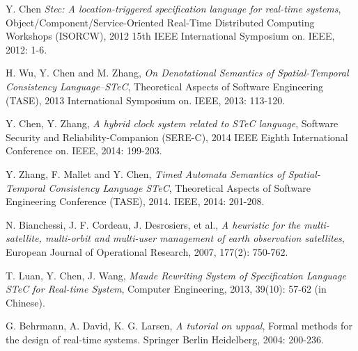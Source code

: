 \begin{thebibliography}{2}
Y. Chen \emph{Stec: A location-triggered specification language for real-time systems}, Object/Component/Service-Oriented Real-Time Distributed Computing Workshops (ISORCW), 2012 15th IEEE International Symposium on. IEEE, 2012: 1-6.

H. Wu, Y. Chen and M. Zhang, \emph{On Denotational Semantics of Spatial-Temporal Consistency Language--STeC}, Theoretical Aspects of Software Engineering (TASE), 2013 International Symposium on. IEEE, 2013: 113-120.

Y. Chen, Y. Zhang, \emph{A hybrid clock system related to STeC language}, Software Security and Reliability-Companion (SERE-C), 2014 IEEE Eighth International Conference on. IEEE, 2014: 199-203.

Y. Zhang, F. Mallet and Y. Chen, \emph{Timed Automata Semantics of Spatial-Temporal Consistency Language STeC}, Theoretical Aspects of Software Engineering Conference (TASE), 2014. IEEE, 2014: 201-208.

N. Bianchessi, J. F. Cordeau, J. Desrosiers, et al., \emph{A heuristic for the multi-satellite, multi-orbit and multi-user management of earth observation satellites}, European Journal of Operational Research, 2007, 177(2): 750-762.

T. Luan, Y. Chen, J. Wang, \emph{Maude Rewriting System of Specification Language STeC for Real-time System}, Computer Engineering, 2013, 39(10): 57-62 (in Chinese).

G. Behrmann, A. David, K. G. Larsen, \emph{A tutorial on uppaal}, Formal methods for the design of real-time systems. Springer Berlin Heidelberg, 2004: 200-236.


\end{thebibliography}
